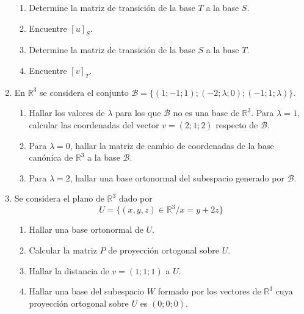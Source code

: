 \documentclass[12pt,letterpaper]{article}
\begin{document}
\begin{enumerate}
  \begin{enumerate}
    \item Determine la matriz de transición de la base $T$ a la base $S$.
    \item Encuentre $[u]_S$. 
    \item Determine la matriz de transición de la base $S$ a la base $T$.
    \item Encuentre $[v]_T$.
  \end{enumerate}
  \item En $\mathbb{R}^3$ se considera el conjunto $\mathcal{B} = \{(1;-1; 1); (-2; \lambda; 0); (-1; 1; \lambda)\}$.
  \begin{enumerate}
    \item Hallar los valores de $\lambda$ para los que $\mathcal{B}$ no es una base de $\mathbb{R}^3$.
    Para $\lambda = 1$, calcular las coordenadas del vector $v = (2; 1; 2)$ respecto de $\mathcal{B}$.
    \item Para $\lambda = 0$, hallar la matriz de cambio de coordenadas de la base canónica de $\mathbb{R}^3$ a la base $\mathcal{B}$.
    \item Para $\lambda = 2$, hallar una base ortonormal del subespacio generado por $\mathcal{B}$.
  \end{enumerate}
  \item Se considera el plano de $\mathbb{R}^3$ dado por
  $$
  U=\{(x,y,z)\in\mathbb{R}^3 / x=y+2z\}
  $$
  \begin{enumerate}
    \item Hallar una base ortonormal de $U$.
    \item Calcular la matriz $P$ de proyección ortogonal sobre $U$.
    \item Hallar la distancia de $v = (1; 1; 1)$ a $U$.
    \item Hallar una base del subespacio $W$ formado por los vectores de $\mathbb{R}^3$ cuya proyección ortogonal sobre $U$ es $(0; 0; 0)$.
  \end{enumerate}
\end{enumerate}
\end{document}
